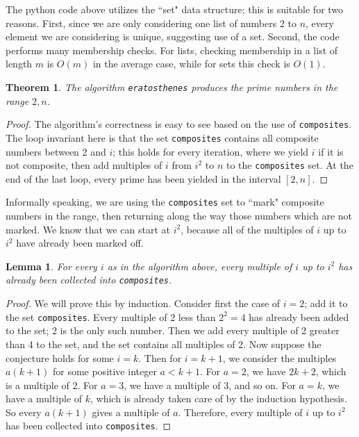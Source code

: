 \documentclass{amsart}
\newtheorem{thm}{Theorem}
\newtheorem{lem}{Lemma}
\theoremstyle{definition}
\theoremstyle{case}
\begin{document}
	The python code above utilizes the ``set" data structure; this is suitable for two reasons. First, since we are only considering one list of numbers 2 to $n$, every element we are considering is unique, suggesting use of a set. Second, the code performs many membership checks. For lists, checking membership in a list of length $m$ is $O(m)$ in the average case, while for sets this check is $O(1)$.
	
	\begin{thm}
		The algorithm \texttt{eratosthenes} produces the prime numbers in the range $2, n$.
	\end{thm}
	\begin{proof}
		The algorithm's correctness is easy to see based on the use of \texttt{composites}. The loop invariant here is that the set \texttt{composites} contains all composite numbers between 2 and $i$; this holds for every iteration, where we yield $i$ if it is not composite, then add multiples of $i$ from $i^2$ to $n$ to the \texttt{composites} set. At the end of the last loop, every prime has been yielded in the interval $[2, n]$.
	\end{proof}

	Informally speaking, we are using the \texttt{composites} set to ``mark" composite numbers in the range, then returning along the way those numbers which are not marked. We know that we can start at $i^2$, because all of the multiples of $i$ up to $i^2$ have already been marked off.
	
	\begin{lem}
		For every $i$ as in the algorithm above, every multiple of $i$ up to $i^2$ has already been collected into \texttt{composites}.
	\end{lem}
	\begin{proof}
		We will prove this by induction. Consider first the case of $i=2$; add it to the set \texttt{composites}. Every multiple of 2 less than $2^2 = 4$ has already been added to the set; 2 is the only such number. Then we add every multiple of 2 greater than 4 to the set, and the set contains all multiples of 2.
		Now suppose the conjecture holds for some $i=k$. Then for $i=k+1$, we consider the multiples $a(k+1)$ for some positive integer $a<k+1$. For $a=2$, we have $2k+2$, which is a multiple of 2. For $a=3$, we have a multiple of 3, and so on. For $a=k$, we have a multiple of $k$, which is already taken care of by the induction hypothesis. So every $a(k+1)$ gives a multiple of $a$. Therefore, every multiple of $i$ up to $i^2$ has been collected into \texttt{composites}.
	\end{proof}
	
\end{document}
